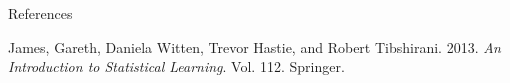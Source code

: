 \documentclass[
  10pt,
  ignorenonframetext,
]{beamer}
\newlength{\cslhangindent}
\newlength{\cslentryspacingunit} %
\newenvironment{CSLReferences}[2] %
 {%
  \setlength{\parindent}{0pt}
  \ifodd #1
  \let\oldpar\par
  \def\par{\hangindent=\cslhangindent\oldpar}
  \fi
  \setlength{\parskip}{#2\cslentryspacingunit}
 }%
 {}
\begin{document}
\begin{frame}{References}
\protect\hypertarget{references}{}
\hypertarget{refs}{}
\begin{CSLReferences}{1}{0}
\leavevmode{}%
James, Gareth, Daniela Witten, Trevor Hastie, and Robert Tibshirani.
2013. \emph{An Introduction to Statistical Learning}. Vol. 112.
Springer.

\end{CSLReferences}
\end{frame}
\end{document}
